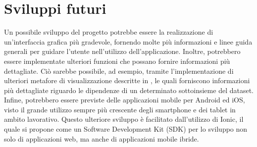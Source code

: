 \section{Sviluppi futuri}
Un possibile sviluppo del progetto potrebbe essere la realizzazione di un'interfaccia grafica pi\`{u} gradevole, fornendo molte pi\`{u} informazioni e linee guida generali per guidare l'utente nell'utilizzo dell'applicazione. Inoltre, potrebbero essere implementate ulteriori funzioni che possano fornire informazioni pi\`{u} dettagliate. Ci\`{o} sarebbe possibile, ad esempio, tramite l'implementazione di ulteriori metafore di visualizzazione descritte in \cite{mdvisualization}, le quali forniscono informazioni pi\`{u} dettagliate riguardo le dipendenze di un determinato sottoinsieme del dataset. Infine, potrebbero essere previste delle applicazioni mobile per Android ed iOS, visto il grande utilizzo sempre pi\`{u} crescente degli smartphone e dei tablet in ambito lavorativo. Questo ulteriore sviluppo \`{e} facilitato dall'utilizzo di Ionic, il quale si propone come un Software Development Kit (SDK) per lo sviluppo non solo di applicazioni web, ma anche di applicazioni mobile ibride.

\newpage
